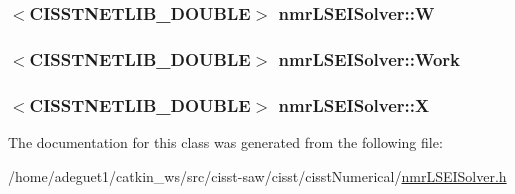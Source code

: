 \hypertarget{classnmr_l_s_e_i_solver_ab4e958a8679e59284ab62db215533c67}{
\subsubsection[{W}]{$<$C\-I\-S\-S\-T\-N\-E\-T\-L\-I\-B\-\_\-\-D\-O\-U\-B\-L\-E$>$ nmr\-L\-S\-E\-I\-Solver\-::\-W\hspace{0.3cm}{\ttfamily [protected]}}}\label{classnmr_l_s_e_i_solver_ab4e958a8679e59284ab62db215533c67}
\hypertarget{classnmr_l_s_e_i_solver_a94fbd24b049a1561921e78657ed07646}{
\subsubsection[{Work}]{$<$C\-I\-S\-S\-T\-N\-E\-T\-L\-I\-B\-\_\-\-D\-O\-U\-B\-L\-E$>$ nmr\-L\-S\-E\-I\-Solver\-::\-Work\hspace{0.3cm}{\ttfamily [protected]}}}\label{classnmr_l_s_e_i_solver_a94fbd24b049a1561921e78657ed07646}
\hypertarget{classnmr_l_s_e_i_solver_ab5f8afa5ce2709553fb43e161f05273d}{
\subsubsection[{X}]{$<$C\-I\-S\-S\-T\-N\-E\-T\-L\-I\-B\-\_\-\-D\-O\-U\-B\-L\-E$>$ nmr\-L\-S\-E\-I\-Solver\-::\-X\hspace{0.3cm}{\ttfamily [protected]}}}\label{classnmr_l_s_e_i_solver_ab5f8afa5ce2709553fb43e161f05273d}


The documentation for this class was generated from the following file\-:\begin{DoxyCompactItemize}
\item 
/home/adeguet1/catkin\-\_\-ws/src/cisst-\/saw/cisst/cisst\-Numerical/\hyperlink{nmr_l_s_e_i_solver_8h}{nmr\-L\-S\-E\-I\-Solver.\-h}\end{DoxyCompactItemize}
